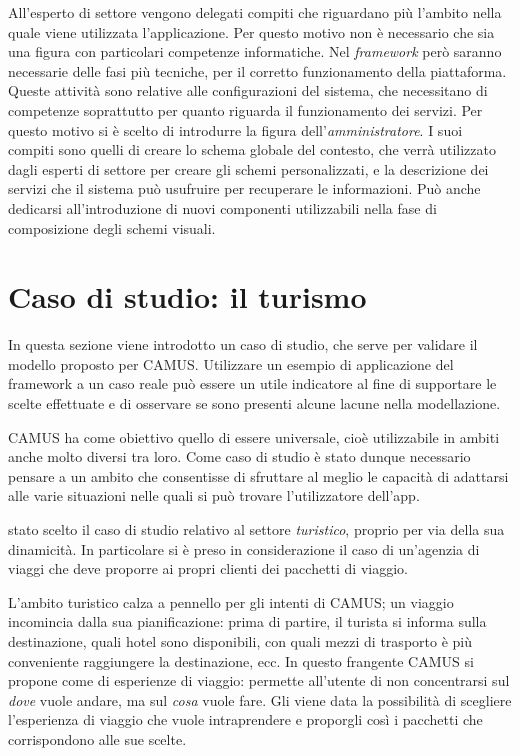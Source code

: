 All'esperto di settore vengono delegati compiti che riguardano più l'ambito nella quale viene utilizzata l'applicazione. Per questo motivo non è necessario che sia una figura con particolari competenze informatiche. Nel \emph{framework} però saranno necessarie delle fasi più tecniche, per il corretto funzionamento della piattaforma. Queste attività sono relative alle configurazioni del sistema, che necessitano di competenze soprattutto per quanto riguarda il funzionamento dei servizi. Per questo motivo si è scelto di introdurre la figura dell'\emph{amministratore}. I suoi compiti sono quelli di creare lo schema globale del contesto, che verrà utilizzato dagli esperti di settore per creare gli schemi personalizzati, e la descrizione dei servizi che il sistema può usufruire per recuperare le informazioni. Può anche dedicarsi all'introduzione di nuovi componenti utilizzabili nella fase di composizione degli schemi visuali.

\section{Caso di studio: il turismo\label{sec:caso-studio-turismo}}

In questa sezione viene introdotto un caso di studio, che serve per validare il modello proposto per CAMUS. Utilizzare un esempio di applicazione del framework a un caso reale può essere un utile indicatore al fine di supportare le scelte effettuate e di osservare se sono presenti alcune lacune nella modellazione.

CAMUS ha come obiettivo quello di essere universale, cioè utilizzabile in ambiti anche molto diversi tra loro. Come caso di studio è stato dunque necessario pensare a un ambito che consentisse di sfruttare al meglio le capacità di adattarsi alle varie situazioni nelle quali si può trovare l'utilizzatore dell'app.

\upe stato scelto il caso di studio relativo al settore \emph{turistico}, proprio per via della sua dinamicità. In particolare si è preso in considerazione il caso di un'agenzia di viaggi che deve proporre ai propri clienti dei pacchetti di viaggio.

L'ambito turistico calza a pennello per gli intenti di CAMUS; un viaggio incomincia dalla sua pianificazione: prima di partire, il turista si informa sulla destinazione, quali hotel sono disponibili, con quali mezzi di trasporto è più conveniente raggiungere la destinazione, ecc. In questo frangente CAMUS si propone come  di esperienze di viaggio: permette all'utente di non concentrarsi sul \emph{dove} vuole andare, ma sul \emph{cosa} vuole fare. Gli viene data la possibilità di scegliere l'esperienza di viaggio che vuole intraprendere e proporgli così i pacchetti che corrispondono alle sue scelte.

